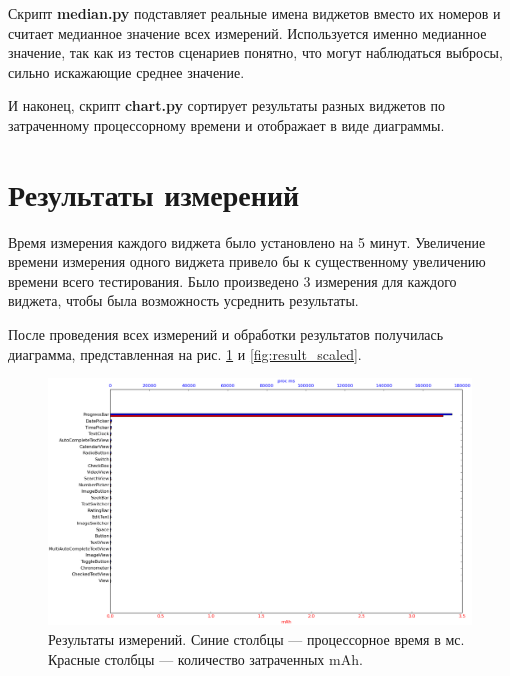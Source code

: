 \documentclass[a4paper,14pt]{extarticle} %
\begin{document}
	Скрипт \textbf{median.py} подставляет реальные имена виджетов вместо их номеров и считает медианное значение всех измерений. Используется именно медианное значение, так как из тестов сценариев понятно, что могут наблюдаться выбросы, сильно искажающие среднее значение. 
	
	И наконец, скрипт \textbf{chart.py} сортирует результаты разных виджетов по затраченному процессорному времени и отображает в виде диаграммы.
	
	\clearpage
	\section{Результаты измерений}
	
	Время измерения каждого виджета было установлено на 5 минут. Увеличение времени измерения одного виджета привело бы к существенному увеличению времени всего тестирования. Было произведено 3 измерения для каждого виджета, чтобы была возможность усреднить результаты.
	
	После проведения всех измерений и обработки результатов получилась диаграмма, представленная на рис. \ref{fig:result} и \ref{fig:result_scaled}.
	
	\begin{figure}[!htb]
		\includegraphics[width=\textwidth]{result}
		\caption{Результаты измерений. Синие столбцы --- процессорное время в мс. Красные столбцы --- количество затраченных mAh.}
		\label{fig:result}
	\end{figure}
\end{document}
